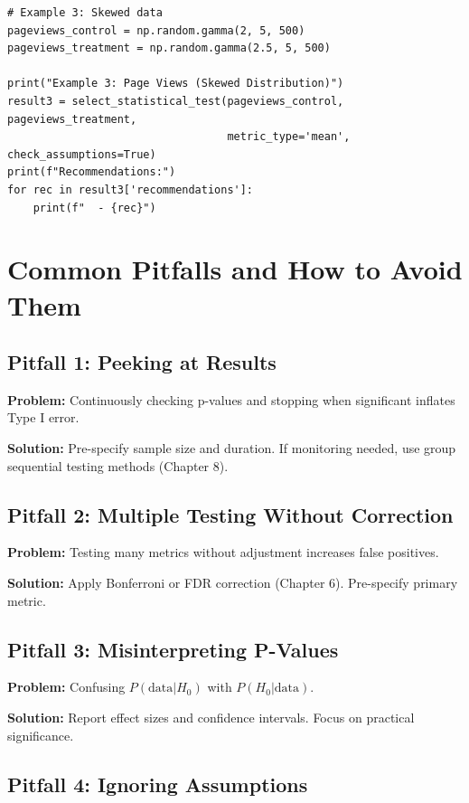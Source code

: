 \begin{lstlisting}
# Example 3: Skewed data
pageviews_control = np.random.gamma(2, 5, 500)
pageviews_treatment = np.random.gamma(2.5, 5, 500)

print("Example 3: Page Views (Skewed Distribution)")
result3 = select_statistical_test(pageviews_control, pageviews_treatment,
                                  metric_type='mean', check_assumptions=True)
print(f"Recommendations:")
for rec in result3['recommendations']:
    print(f"  - {rec}")
\end{lstlisting}

\section{Common Pitfalls and How to Avoid Them}

\subsection{Pitfall 1: Peeking at Results}

\textbf{Problem:} Continuously checking p-values and stopping when significant inflates Type I error.

\textbf{Solution:} Pre-specify sample size and duration. If monitoring needed, use group sequential testing methods (Chapter 8).

\subsection{Pitfall 2: Multiple Testing Without Correction}

\textbf{Problem:} Testing many metrics without adjustment increases false positives.

\textbf{Solution:} Apply Bonferroni or FDR correction (Chapter 6). Pre-specify primary metric.

\subsection{Pitfall 3: Misinterpreting P-Values}

\textbf{Problem:} Confusing $P(\text{data}|H_0)$ with $P(H_0|\text{data})$.

\textbf{Solution:} Report effect sizes and confidence intervals. Focus on practical significance.

\subsection{Pitfall 4: Ignoring Assumptions}

